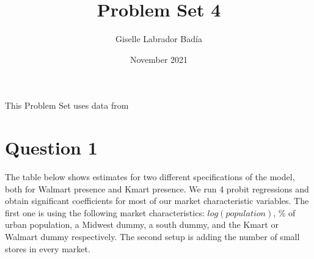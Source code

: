 \documentclass{article}
\title{Problem Set 4}
\author{Giselle Labrador Badía}
\date{November 2021}
\theoremstyle{definition}
\begin{document}
\maketitle

This Problem Set uses data from \cite{jia2008happens}
\section*{Question 1}

The table below shows estimates for two different specifications of the model, both for Walmart presence and Kmart presence. We run 4 probit regressions and obtain significant coefficients for most of our market characteristic variables. The first one is using the following market characteristics: $log(population)$, \% of urban population, a Midwest dummy, a south dummy, and the Kmart or Walmart dummy respectively. The second setup is adding the number of small stores in every market. 
\end{document}
